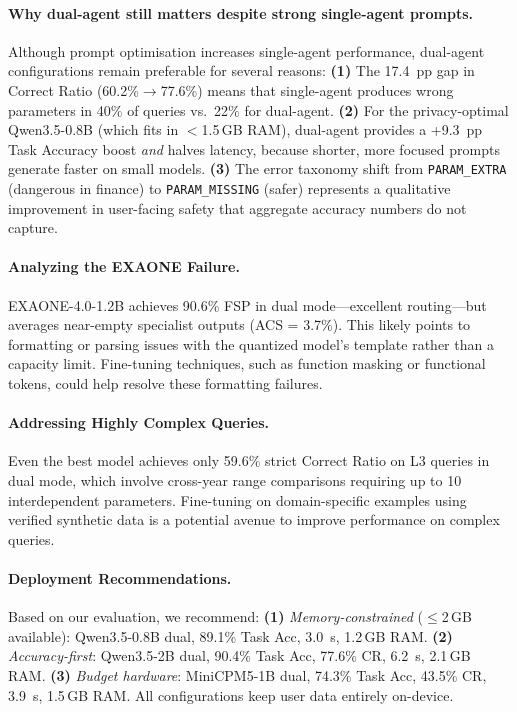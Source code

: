 \documentclass[11pt,twocolumn]{article}
\begin{document}
\paragraph{Why dual-agent still matters despite strong single-agent prompts.}
Although prompt optimisation increases single-agent performance,
dual-agent configurations remain preferable for several reasons:
\textbf{(1)} The 17.4~pp gap in Correct Ratio (60.2\%$\to$77.6\%)
means that single-agent produces wrong parameters in 40\% of queries
vs.\ 22\% for dual-agent.
\textbf{(2)} For the privacy-optimal Qwen3.5-0.8B (which fits in
$<$1.5\,GB RAM), dual-agent provides a +9.3~pp Task Accuracy boost
\emph{and} halves latency, because shorter, more focused prompts
generate faster on small models.
\textbf{(3)} The error taxonomy shift from \texttt{PARAM\_EXTRA}
(dangerous in finance) to \texttt{PARAM\_MISSING} (safer) represents
a qualitative improvement in user-facing safety that aggregate
accuracy numbers do not capture.

\paragraph{Analyzing the EXAONE Failure.}
EXAONE-4.0-1.2B achieves 90.6\% FSP in dual mode---excellent
routing---but averages near-empty specialist outputs (ACS = 3.7\%).
This likely points to formatting or parsing issues with the quantized
model's template rather than a capacity limit.
Fine-tuning techniques, such as function masking or functional tokens,
could help resolve these formatting failures.

\paragraph{Addressing Highly Complex Queries.}
Even the best model achieves only 59.6\% strict Correct Ratio on L3
queries in dual mode, which involve cross-year range comparisons
requiring up to 10 interdependent parameters.
Fine-tuning on domain-specific examples using verified synthetic data
\citep{liu2024apigen} is a potential avenue to improve performance on
complex queries.

\paragraph{Deployment Recommendations.}
Based on our evaluation, we recommend:
\textbf{(1)} \emph{Memory-constrained} ($\leq$2\,GB available):
Qwen3.5-0.8B dual, 89.1\% Task Acc, 3.0~s, 1.2\,GB RAM.
\textbf{(2)} \emph{Accuracy-first}: Qwen3.5-2B dual, 90.4\% Task
Acc, 77.6\% CR, 6.2~s, 2.1\,GB RAM.
\textbf{(3)} \emph{Budget hardware}: MiniCPM5-1B dual, 74.3\% Task
Acc, 43.5\% CR, 3.9~s, 1.5\,GB RAM.
All configurations keep user data entirely on-device.
\end{document}
